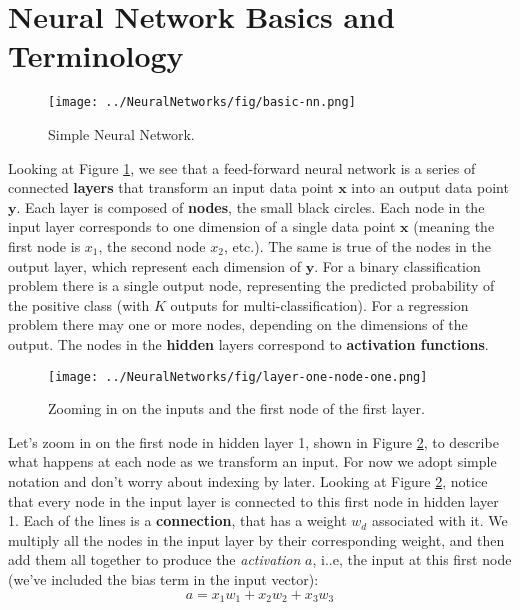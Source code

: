 \section{Neural Network Basics and Terminology}

\begin{figure}
    \centering
    \texttt{[image: ../NeuralNetworks/fig/basic-nn.png]}
    \caption{Simple Neural Network.}
    \label{fig:basic-nn}
\end{figure}

Looking at Figure \ref{fig:basic-nn}, we see that a feed-forward neural network is a series of connected \textbf{layers} that transform an input data point $\textbf{x}$ into an output data point $\textbf{y}$. Each layer is composed of \textbf{nodes}, the small black circles. Each node in the input layer corresponds to one dimension of a single data point $\textbf{x}$ (meaning the first node is $x_1$, the second node $x_2$, etc.). The same is true of the nodes in the output layer, which represent each dimension of $\textbf{y}$.  For a binary classification problem there is a single output node, representing the predicted probability of the positive class (with $K$ outputs for multi-classification). For a regression problem there may one or more nodes, depending on the dimensions of the output.  The nodes in the  \textbf{hidden} layers correspond to  \textbf{activation functions}.

\begin{figure}
    \centering
    \texttt{[image: ../NeuralNetworks/fig/layer-one-node-one.png]}
    \caption{Zooming in on the inputs and the first node of the first layer.}
    \label{fig:layer-one-node-one}
\end{figure}

 Let's zoom in on the first node in hidden layer 1, shown in Figure \ref{fig:layer-one-node-one}, to describe what happens at each node as we transform an input. For now we adopt simple notation and don't worry about indexing by later.
Looking at Figure \ref{fig:layer-one-node-one}, notice that every node in the input layer is connected to this first node in hidden layer 1. Each of the lines is a \textbf{connection}, that has a weight $w_{d}$ associated with it. We multiply all the nodes in the input layer by their corresponding weight, and then add them all together to produce the {\em activation} $a$, i..e,  the input at this first node (we've included the bias term in the input vector):
\begin{equation}
	a = x_{1} w_{1} + x_{2} w_{2} + x_{3} w_{3}
\end{equation}


